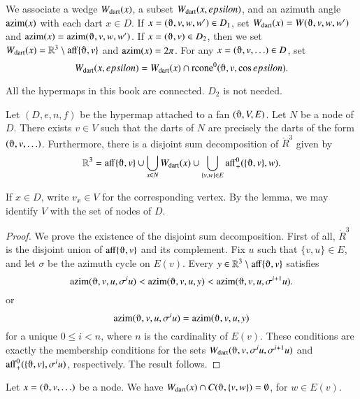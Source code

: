 We associate a wedge $W_{\text{dart}}(x)$, a subset $W_{\text{dart}}(x,epsilon)$,
and an azimuth angle ${\operatorname{azim}}(x)$
with each dart $x\in D$.  If
$x=(\orgn,v,w,w')\in D_1$, set
$\Wdart(x) = W(\orgn,v,w,w')$ and $\op{azim}(x) =
\op{azim}(\orgn,v,w,w')$.   If $x=(\orgn,v)\in D_2$, then we set
$\Wdart(x) = \ring{R}^3\setminus \op{aff}\{\orgn,v\}$ and ${\operatorname{azim}}(x) = 2\pi$.  For any $x = (\orgn,v,\ldots)\in D$, set
    $$
    \Wdart(x,\epsilon) = \Wdart(x) \cap \op{rcone}^0(\orgn,v,\cos\epsilon).
    $$

\begin{note}%
All the hypermaps in this book are connected. $D_2$ is not needed.
\end{note}


\begin{lemma}
Let $(D,e,n,f)$ be the hypermap attached to a 
fan $(\orgn,V,E)$.
Let $N$ be a node of $D$.  There exists $v\in V$
such that the darts of $N$ are precisely
the darts of the form $(\orgn,v,\ldots)$.  Furthermore, there is a 
disjoint sum decomposition of $\ring{R}^3$ given by
  $$
  \ring{R}^3 = 
  \op{aff}\{\orgn,v\} \cup
  \bigcup_{x\in N} \Wdart(x)  \cup 
  \bigcup_{\{v,w\}\in E} \op{aff}_+^0(\{\orgn,v\},w).
  $$
\end{lemma}

If $x\in D$, write $v_x\in V$ for the corresponding vertex.  By the lemma,
we may identify $V$ with the set of nodes of $D$.

\begin{proof}
We prove the existence of the disjoint sum decomposition.
First of all, $\ring{R}^3$ is the disjoint union of $\op{aff}\{\orgn,v\}$
and its complement.
Fix $u$ such that $\{v,u\}\in E$, and let $\sigma$ be the azimuth
cycle on $E(v)$.  Every $y\in\ring{R}^3\setminus\op{aff}\{\orgn,v\}$ satisfies
$$
\op{azim}(\orgn,v,u,\sigma^i u)<
\op{azim}(\orgn,v,u,y) < \op{azim}(\orgn,v,u,\sigma^{i+1} u).
$$
or 
$$
\op{azim}(\orgn,v,u,\sigma^i u) = \op{azim}(\orgn,v,u,y)
$$
for a unique $0 \le i < n$, where $n$ is the cardinality of $E(v)$.
These conditions are exactly the membership conditions for the sets
$
\Wdart(\orgn,v,\sigma^i u,\sigma^{i+1}u)
$
and $\op{aff}_+^0(\{\orgn,v\},\sigma^iu)$, respectively.
The result follows.
\end{proof}

\begin{corollary}
Let $x = (\orgn,v,\ldots)$ be a node.
We have $\Wdart(x)\cap C(\orgn,\{v,w\})=\emptyset$, for $w\in E(v)$.
\end{corollary}

